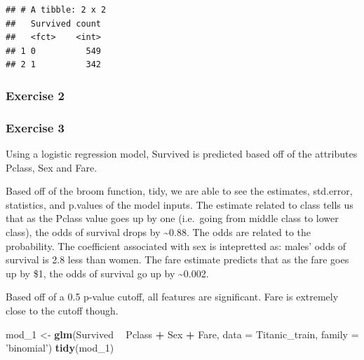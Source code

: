 \documentclass[]{article}
\newenvironment{Shaded}{\begin{snugshade}}{\end{snugshade}}
\newcommand{\KeywordTok}[1]{\textcolor[rgb]{0.13,0.29,0.53}{\textbf{#1}}}
\newcommand{\DataTypeTok}[1]{\textcolor[rgb]{0.13,0.29,0.53}{#1}}
\newcommand{\DecValTok}[1]{\textcolor[rgb]{0.00,0.00,0.81}{#1}}
\newcommand{\FloatTok}[1]{\textcolor[rgb]{0.00,0.00,0.81}{#1}}
\newcommand{\StringTok}[1]{\textcolor[rgb]{0.31,0.60,0.02}{#1}}
\newcommand{\OperatorTok}[1]{\textcolor[rgb]{0.81,0.36,0.00}{\textbf{#1}}}
\newcommand{\NormalTok}[1]{#1}
\begin{document}
\begin{verbatim}
## # A tibble: 2 x 2
##   Survived count
##   <fct>    <int>
## 1 0          549
## 2 1          342
\end{verbatim}

\subsubsection{Exercise 2}\label{exercise-2}

\begin{Shaded}
\end{Shaded}

\subsubsection{Exercise 3}\label{exercise-3}

Using a logistic regression model, Survived is predicted based off of
the attributes Pclass, Sex and Fare.

Based off of the broom function, tidy, we are able to see the estimates,
std.error, statistics, and p.values of the model inputs. The estimate
related to class tells us that as the Pclass value goes up by one
(i.e.~going from middle class to lower class), the odds of survival
drops by \textasciitilde{}0.88. The odds are related to the probability.
The coefficient associated with sex is intepretted as: males' odds of
survival is 2.8 less than women. The fare estimate predicts that as the
fare goes up by \$1, the odds of survival go up by
\textasciitilde{}0.002.

Based off of a 0.5 p-value cutoff, all features are significant. Fare is
extremely close to the cutoff though.

\begin{Shaded}
\begin{Highlighting}[]
\NormalTok{mod_}\DecValTok{1}\NormalTok{ <-}\StringTok{ }\KeywordTok{glm}\NormalTok{(Survived }\OperatorTok{~}\StringTok{ }\NormalTok{Pclass }\OperatorTok{+}\StringTok{ }\NormalTok{Sex }\OperatorTok{+}\StringTok{ }\NormalTok{Fare, }\DataTypeTok{data =}\NormalTok{ Titanic_train, }\DataTypeTok{family =} \StringTok{'binomial'}\NormalTok{)}
\KeywordTok{tidy}\NormalTok{(mod_}\DecValTok{1}\NormalTok{)}
\end{Highlighting}
\end{Shaded}
\end{document}
